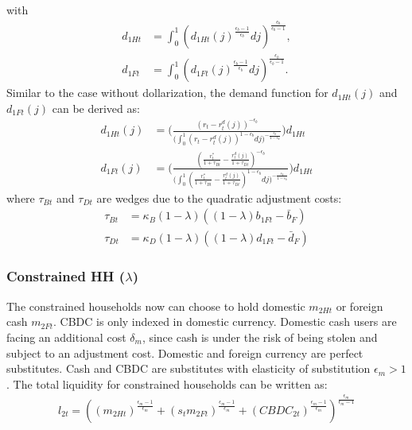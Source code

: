 \documentclass[12pt]{article}
\begin{document}
with 
\begin{align*}
d_{1Ht} &= \int_0^1({d_{1Ht}(j)}^{\frac{\epsilon_b-1}{\epsilon_b}}dj)^{\frac{\epsilon_b}{\epsilon_b-1}}, \\
d_{1Ft} &= \int_0^1({d_{1Ft}(j)}^{\frac{\epsilon_b-1}{\epsilon_b}}dj)^{\frac{\epsilon_b}{\epsilon_b-1}}.
\end{align*}
Similar to the case without dollarization, the demand function for $d_{1Ht}(j)$  and $d_{1Ft}(j)$ can be derived as:
\begin{align*}
d_{1Ht}(j) &= \Biggl(\frac{(r_t-r_t^d(j))^{-\epsilon_b}}{\big(\int_0^1(r_t-r_t^d(j))^{1-\epsilon_b}dj\big)^{-\frac{\epsilon_b}{1-\epsilon_b}}}\Biggl)d_{1Ht} \\
d_{1Ft}(j) &= \Biggl(\frac{(\frac{r_t^*}{1+\tau_{Bt}}-\frac{r_t^d(j)}{1+\tau_{Dt}})^{-\epsilon_b}}{\big(\int_0^1(\frac{r_t^*}{1+\tau_{Bt}}-\frac{r_t^d(j)}{1+\tau_{Dt}})^{1-\epsilon_b}dj\big)^{-\frac{\epsilon_b}{1-\epsilon_b}}}\Biggl)d_{1Ht}
\end{align*}
where $\tau_{Bt}$ and $\tau_{Dt}$ are wedges due to the quadratic adjustment costs: 
\begin{align*}
\tau_{Bt} &= \kappa_B(1-\lambda)((1-\lambda)b_{1Ft}-\bar{b}_F) \\
\tau_{Dt} &= \kappa_D(1-\lambda)((1-\lambda)d_{1Ft}-\bar{d}_F)
\end{align*}

\subsubsection*{Constrained HH  ($\lambda$)}
The constrained households now can choose to hold domestic $m_{2Ht}$ or foreign cash $m_{2Ft}$. CBDC is only indexed in domestic currency. 
Domestic cash users are facing an additional cost $\delta_m$, since cash is under the risk of being stolen and subject to an adjustment cost. Domestic and foreign currency are perfect substitutes. Cash and CBDC are substitutes with elasticity of substitution $\epsilon_m>1$ . The total liquidity for constrained households can be written as: 
\begin{align*}
l_{2t} = ((m_{2Ht})^{\frac{\epsilon_m-1}{\epsilon_m}}+(s_t m_{2Ft})^{\frac{\epsilon_m-1}{\epsilon_m}}+(CBDC_{2t})^{\frac{\epsilon_m-1}{\epsilon_m}})^{\frac{\epsilon_m}{\epsilon_m-1}}
\end{align*}
\end{document}
